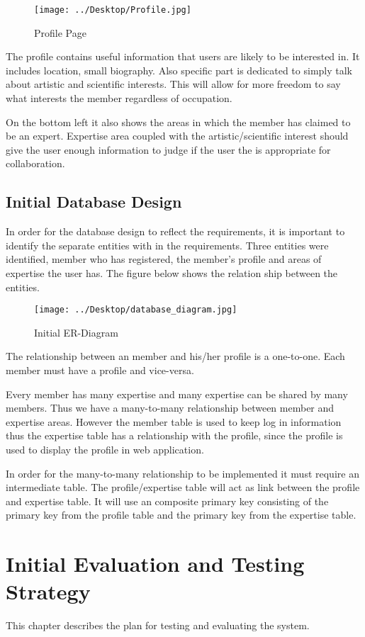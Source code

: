 \documentclass[a4paper,oneside,11pt]{report}
\begin{document}
\begin{figure}[!ht]
\centering
\texttt{[image: ../Desktop/Profile.jpg]}
\caption{Profile Page}
\end{figure}
The profile contains useful information that users are likely to be interested in. It includes location, small biography. Also specific part is dedicated to simply talk about artistic and scientific interests. This will allow for more freedom to say what interests the member regardless of occupation.

On the bottom left it also shows the areas in which the member has claimed to be an expert. Expertise area coupled with the artistic/scientific interest should give the user enough information to judge if the user the is appropriate for collaboration.
\newpage

\section{Initial Database Design}
In order for the database design to reflect the requirements, it is important to identify the separate entities with in the requirements. Three entities were identified, member who has registered, the member's profile and areas of expertise the user has. The figure below shows the relation ship between the entities.

\begin{figure}[!ht]
\centering
\texttt{[image: ../Desktop/database\_diagram.jpg]}
\caption{Initial ER-Diagram}
\end{figure}
The relationship between an member and his/her profile is a one-to-one. Each member must have a profile and vice-versa.

Every member has many expertise and many expertise can be shared by many members. Thus we have a many-to-many relationship between member and expertise areas. However the member table is used to keep log in information thus the expertise table has a relationship with the profile, since the profile is used to display the profile in web application.

In order for the many-to-many relationship to be implemented it must require an intermediate table. The profile/expertise table will act as link between the profile and expertise table. It will use an composite primary key consisting of the primary key from the profile table and the primary key from the expertise table.
\chapter{Initial Evaluation and Testing Strategy}
This chapter describes the plan for testing and evaluating the system.
\end{document}
